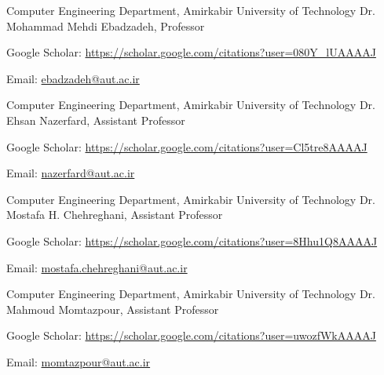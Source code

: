 \begin{cventries}
  \cventry
    {Computer Engineering Department, Amirkabir University of Technology} %
    {Dr. Mohammad Mehdi Ebadzadeh, Professor} %
    {} %
    {} %
    {
      \begin{cvitems} %
        \item {Google Scholar: \href{https://scholar.google.com/citations?user=080Y\_lUAAAAJ&hl=en}{https://scholar.google.com/citations?user=080Y\_lUAAAAJ}}
        \item {Email: \href{mailto:ebadzadeh@aut.ac.ir}{ebadzadeh@aut.ac.ir}}
      \end{cvitems}
    }

  \cventry
    {Computer Engineering Department, Amirkabir University of Technology} %
    {Dr. Ehsan Nazerfard, Assistant Professor} %
    {} %
    {} %
    {
      \begin{cvitems} %
        \item {Google Scholar: \href{https://scholar.google.com/citations?user=Cl5tre8AAAAJ&hl=en}{https://scholar.google.com/citations?user=Cl5tre8AAAAJ}}
        \item {Email: \href{mailto:nazerfard@aut.ac.ir}{nazerfard@aut.ac.ir}}
      \end{cvitems}
    }

  \cventry
    {Computer Engineering Department, Amirkabir University of Technology} %
    {Dr. Mostafa H. Chehreghani, Assistant Professor} %
    {} %
    {} %
    {
      \begin{cvitems} %
        \item {Google Scholar: \href{https://scholar.google.com/citations?user=8Hhu1Q8AAAAJ&hl=en}{https://scholar.google.com/citations?user=8Hhu1Q8AAAAJ}}
        \item {Email: \href{mailto:mostafa.chehreghani@aut.ac.ir}{mostafa.chehreghani@aut.ac.ir}}
      \end{cvitems}
    }

  \cventry
    {Computer Engineering Department, Amirkabir University of Technology} %
    {Dr. Mahmoud Momtazpour, Assistant Professor} %
    {} %
    {} %
    {
      \begin{cvitems} %
        \item {Google Scholar: \href{https://scholar.google.com/citations?user=uwozfWkAAAAJ&hl=en}{https://scholar.google.com/citations?user=uwozfWkAAAAJ}}
        \item {Email: \href{mailto:momtazpour@aut.ac.ir}{momtazpour@aut.ac.ir}}
      \end{cvitems}
    }


\end{cventries}

